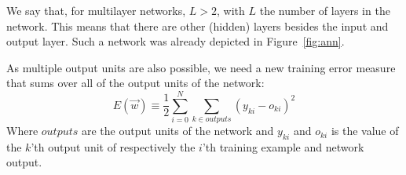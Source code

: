 We say that, for multilayer networks, $L>2$, with $L$ the number of layers in the network. This means that there are other (hidden) layers besides the input and output layer. Such a network was already depicted in Figure~\ref{fig:ann}.

As multiple output units are also possible, we need a new training error measure that sums over all of the output units of the network:
\begin{equation}
    E(\overrightarrow{w}) \equiv \frac{1}{2} \sum_{i=0}^N \sum_{k \in outputs} (y_{ki} - o_{ki})^2
\end{equation}
Where $outputs$ are the output units of the network and $y_{ki}$ and $o_{ki}$ is the value of the $k$'th output unit of respectively the $i$'th training example and network output.\\

